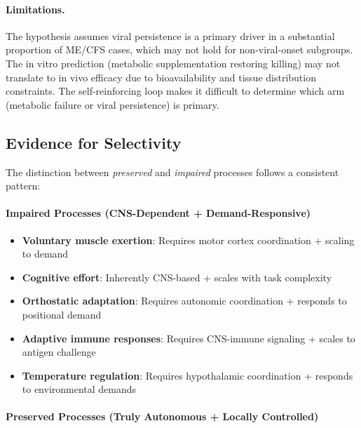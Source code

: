 \begin{hypothesis}
\paragraph{Limitations.}
The hypothesis assumes viral persistence is a primary driver in a substantial proportion of ME/CFS cases, which may not hold for non-viral-onset subgroups. The in vitro prediction (metabolic supplementation restoring killing) may not translate to in vivo efficacy due to bioavailability and tissue distribution constraints. The self-reinforcing loop makes it difficult to determine which arm (metabolic failure or viral persistence) is primary.
\end{hypothesis}

\subsection{Evidence for Selectivity}

The distinction between \emph{preserved} and \emph{impaired} processes follows a consistent pattern:

\paragraph{Impaired Processes (CNS-Dependent + Demand-Responsive)}
\begin{itemize}
    \item \textbf{Voluntary muscle exertion}: Requires motor cortex coordination + scaling to demand
    \item \textbf{Cognitive effort}: Inherently CNS-based + scales with task complexity
    \item \textbf{Orthostatic adaptation}: Requires autonomic coordination + responds to positional demand
    \item \textbf{Adaptive immune responses}: Requires CNS-immune signaling + scales to antigen challenge
    \item \textbf{Temperature regulation}: Requires hypothalamic coordination + responds to environmental demands
\end{itemize}

\paragraph{Preserved Processes (Truly Autonomous + Locally Controlled)}

